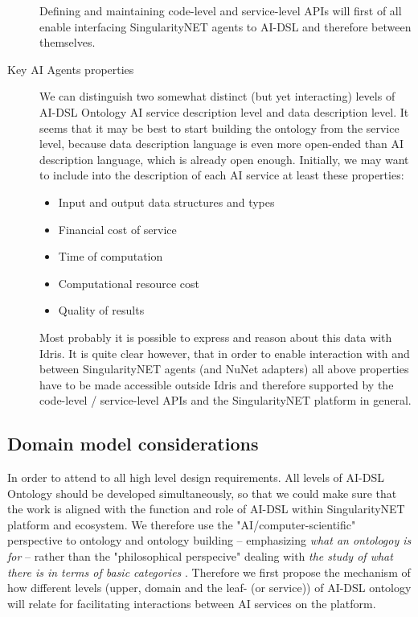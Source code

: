 \documentclass[]{report}
\begin{document}
\begin{description}
  Defining and maintaining code-level and service-level APIs will first of all
  enable interfacing SingularityNET agents to AI-DSL and therefore between
  themselves.

  \item[Key AI Agents properties] We can distinguish two somewhat distinct (but
  yet interacting) levels of AI-DSL Ontology AI service description level and
  data description level. It seems that it may be best to start building the
  ontology from the service level, because data description language is even
  more open-ended than AI description language, which is already open enough.
  Initially, we may want to include into the description of each AI service at
  least these properties: \begin{itemize} \item Input and output data structures
  and types \item Financial cost of service \item Time of computation \item
  Computational resource cost \item Quality of results \end{itemize} Most
  probably it is possible to express and reason about this data with Idris. It
  is quite clear however, that in order to enable interaction with and between
  SingularityNET agents (and NuNet adapters) all above properties have to be
  made accessible outside Idris and therefore supported by the code-level /
  service-level APIs and the SingularityNET platform in general.

\end{description}

\subsection{Domain model considerations}
\label{domain_model_considerations}

In order to attend to all high level design requirements. All levels of AI-DSL
Ontology should be developed simultaneously, so that we could make sure that the
work is aligned with the function and role of AI-DSL within SingularityNET
platform and ecosystem. We therefore use the "AI/computer-scientific"
perspective to ontology and ontology building -- emphasizing \textit{what an
ontologoy is for} -- rather than the "philosophical perspecive" dealing with
\textit{the study of what there is in terms of basic categories}
\cite{gruber_translation_1993,sep-logic-ontology}. Therefore we first propose
the  mechanism of how different levels (upper, domain and the leaf- (or
service)) of AI-DSL ontology will relate for facilitating interactions between
AI services on the platform.
\end{document}
